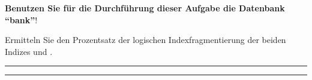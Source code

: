 \item \textbf{Benutzen Sie für die Durchführung dieser Aufgabe die
Datenbank \enquote{bank}}!

Ermitteln Sie den Prozentsatz der logischen Indexfragmentierung der beiden
Indizes  und .

\rule{0.93\textwidth}{0.5pt}

\rule{0.93\textwidth}{0.5pt}
